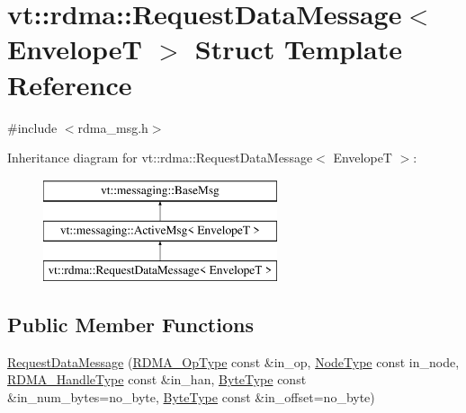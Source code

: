 \hypertarget{structvt_1_1rdma_1_1_request_data_message}{}\section{vt\+:\+:rdma\+:\+:Request\+Data\+Message$<$ EnvelopeT $>$ Struct Template Reference}
\label{structvt_1_1rdma_1_1_request_data_message}


{\ttfamily \#include $<$rdma\+\_\+msg.\+h$>$}

Inheritance diagram for vt\+:\+:rdma\+:\+:Request\+Data\+Message$<$ EnvelopeT $>$\+:\begin{figure}[H]
\begin{center}
\leavevmode
\includegraphics[height=3.000000cm]{structvt_1_1rdma_1_1_request_data_message}
\end{center}
\end{figure}
\subsection*{Public Member Functions}
\begin{DoxyCompactItemize}
\item 
\hyperlink{structvt_1_1rdma_1_1_request_data_message_a9dee2c546d86b072f2929554402124a1}{Request\+Data\+Message} (\hyperlink{namespacevt_1_1rdma_a9b966d9780a2b41afe7cd7b7b4b20300}{R\+D\+M\+A\+\_\+\+Op\+Type} const \&in\+\_\+op, \hyperlink{namespacevt_a866da9d0efc19c0a1ce79e9e492f47e2}{Node\+Type} const in\+\_\+node, \hyperlink{namespacevt_a10442579ec4e7ebef223818e64bcf908}{R\+D\+M\+A\+\_\+\+Handle\+Type} const \&in\+\_\+han, \hyperlink{namespacevt_aab8d55968084610ce3b17057981e9300}{Byte\+Type} const \&in\+\_\+num\+\_\+bytes=no\+\_\+byte, \hyperlink{namespacevt_aab8d55968084610ce3b17057981e9300}{Byte\+Type} const \&in\+\_\+offset=no\+\_\+byte)
\end{DoxyCompactItemize}
